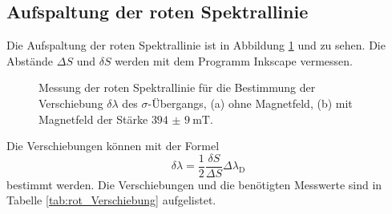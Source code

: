 \subsection{Aufspaltung der roten Spektrallinie}
Die Aufspaltung der roten Spektrallinie ist in Abbildung \ref{fig:rot_ohne_B} und zu sehen.
Die Abstände $\Delta S$ und $\delta S$ werden mit dem Programm Inkscape \cite{Inkscape} vermessen.
\FloatBarrier
\begin{figure}
    \centering
    \vspace{0.1\textwidth}
    \caption{Messung der roten Spektrallinie für die Bestimmung der Verschiebung $\delta \lambda$ des $\sigma$-Übergangs, (a) ohne Magnetfeld, (b) mit Magnetfeld der Stärke $\SI{394(9)}{\milli\tesla}$.}
    \label{fig:rot_ohne_B}
\end{figure}
\FloatBarrier
Die Verschiebungen können mit der Formel 
\begin{equation}
    \label{eq:Verschiebung}
    \delta \lambda = \frac{1}{2}\frac{\delta S}{\Delta S}\Delta \lambda_{\text{D}} 
\end{equation}
bestimmt werden.
Die Verschiebungen und die benötigten Messwerte sind in Tabelle \ref{tab:rot_Verschiebung} aufgelistet.
\FloatBarrier
